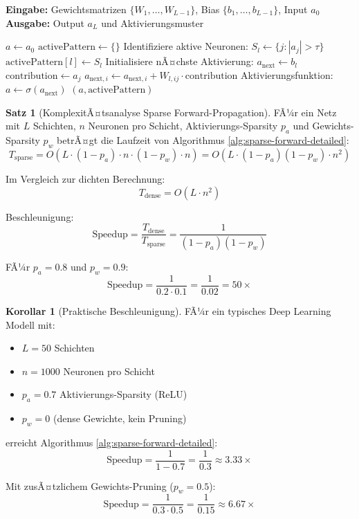 ﻿\documentclass[a4paper,12pt]{report}
\theoremstyle{definition}
\newtheorem{satz}{Satz}
\newtheorem{korollar}{Korollar}
\begin{document}
	\begin{algorithm}[H]
		\caption{Sparse Forward-Propagation mit Aktivierungs-Tracking}
		\label{alg:sparse-forward-detailed}
		\textbf{Eingabe:} Gewichtsmatrizen $\{W_1, \ldots, W_{L-1}\}$, Bias $\{b_1, \ldots, b_{L-1}\}$, Input $a_0$ \\
		\textbf{Ausgabe:} Output $a_L$ und Aktivierungsmuster
		\begin{algorithmic}[1]
			\State $a \gets a_0$
			\State $\text{activePattern} \gets \{\}$ 
			\State Identifiziere aktive Neuronen: $S_l \gets \{j : |a_j| > \tau\}$
			\State $\text{activePattern}[l] \gets S_l$
			\State Initialisiere nÃ¤chste Aktivierung: $a_{\text{next}} \gets b_l$ 
			 
			\State $\text{contribution} \gets a_j$
			 
			\State $a_{\text{next},i} \gets a_{\text{next},i} + W_{l,ij} \cdot \text{contribution}$
			\EndFor
			\EndFor
			\State Aktivierungsfunktion: $a \gets \sigma(a_{\text{next}})$
			\EndFor
			\State \Return $(a, \text{activePattern})$
		\end{algorithmic}
	\end{algorithm}
	
	\begin{satz}[KomplexitÃ¤tsanalyse Sparse Forward-Propagation]
		FÃ¼r ein Netz mit $L$ Schichten, $n$ Neuronen pro Schicht, Aktivierungs-Sparsity $p_a$ und Gewichts-Sparsity $p_w$ betrÃ¤gt die Laufzeit von Algorithmus \ref{alg:sparse-forward-detailed}:
		\[
		T_{\text{sparse}} = O\left( L \cdot (1-p_a) \cdot n \cdot (1-p_w) \cdot n \right) = O(L \cdot (1-p_a)(1-p_w) \cdot n^2)
		\]
		
		Im Vergleich zur dichten Berechnung:
		\[
		T_{\text{dense}} = O(L \cdot n^2)
		\]
		
		Beschleunigung:
		\[
		\text{Speedup} = \frac{T_{\text{dense}}}{T_{\text{sparse}}} = \frac{1}{(1-p_a)(1-p_w)}
		\]
		
		FÃ¼r $p_a = 0.8$ und $p_w = 0.9$:
		\[
		\text{Speedup} = \frac{1}{0.2 \cdot 0.1} = \frac{1}{0.02} = 50\times
		\]
	\end{satz}
	
	\begin{korollar}[Praktische Beschleunigung]
		FÃ¼r ein typisches Deep Learning Modell mit:
		\begin{itemize}
			\item $L = 50$ Schichten
			\item $n = 1000$ Neuronen pro Schicht
			\item $p_a = 0.7$ Aktivierungs-Sparsity (ReLU)
			\item $p_w = 0$ (dense Gewichte, kein Pruning)
		\end{itemize}
		
		erreicht Algorithmus \ref{alg:sparse-forward-detailed}:
		\[
		\text{Speedup} = \frac{1}{1-0.7} = \frac{1}{0.3} \approx 3.33\times
		\]
		
		Mit zusÃ¤tzlichem Gewichts-Pruning ($p_w = 0.5$):
		\[
		\text{Speedup} = \frac{1}{0.3 \cdot 0.5} = \frac{1}{0.15} \approx 6.67\times
		\]
	\end{korollar}
	
\end{document}
